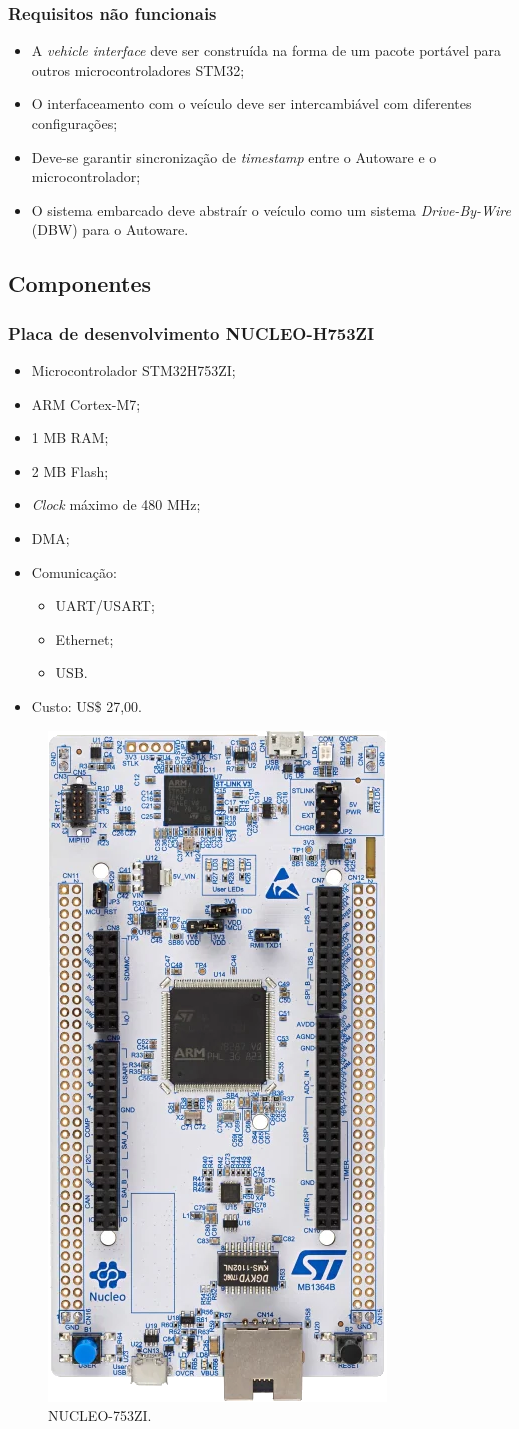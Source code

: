 \subsubsection*{Requisitos não funcionais}
	
	\begin{itemize}
		\item A \textit{vehicle interface} deve ser construída na forma de um pacote portável para outros microcontroladores STM32;
		\item O interfaceamento com o veículo deve ser intercambiável com diferentes configurações;
		\item Deve-se garantir sincronização de \textit{timestamp} entre o Autoware e o microcontrolador;
		\item O sistema embarcado deve abstraír o veículo como um sistema \textit{Drive-By-Wire} (DBW) para o Autoware.
	\end{itemize}
	
\subsection{Componentes}

\subsubsection*{Placa de desenvolvimento NUCLEO-H753ZI}
	
	\begin{itemize}
		\item Microcontrolador STM32H753ZI;
		\item ARM Cortex-M7;
		\item 1 MB RAM;
		\item 2 MB Flash;
		\item \textit{Clock} máximo de 480 MHz;
		\item DMA;
		\item Comunicação:
		\begin{itemize}
			\item UART/USART;
			\item Ethernet;
			\item USB.
		\end{itemize}
		\item Custo: US\$ 27,00.
	\end{itemize}

\begin{figure}[!h]
	\centering
	\includegraphics[width=0.25\linewidth]{img/nucleo}
	\caption{NUCLEO-753ZI.}
	\label{fig:nucleo}
\end{figure}

